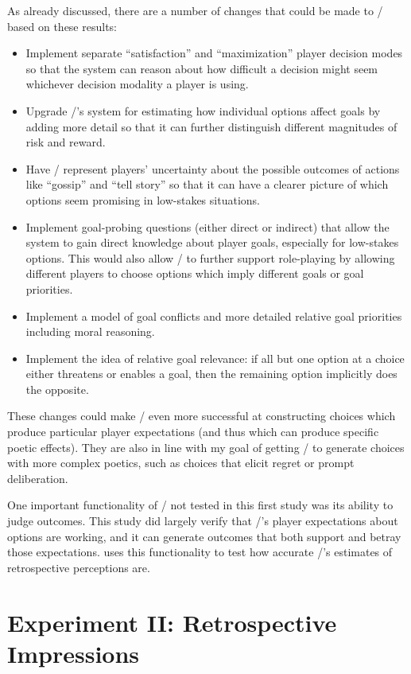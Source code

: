 As already discussed, there are a number of changes that could be made to \dunyazad/ based on these results:
%
\begin{itemize}
  \item Implement separate ``satisfaction'' and ``maximization'' player decision modes so that the system can reason about how difficult a decision might seem whichever decision modality a player is using.
  \item Upgrade \dunyazad/'s system for estimating how individual options affect goals by adding more detail so that it can further distinguish different magnitudes of risk and reward.
  \item Have \dunyazad/ represent players' uncertainty about the possible outcomes of actions like ``gossip'' and ``tell story'' so that it can have a clearer picture of which options seem promising in low-stakes situations.
  \item Implement goal-probing questions (either direct or indirect) that allow the system to gain direct knowledge about player goals, especially for low-stakes options. This would also allow \dunyazad/ to further support role-playing by allowing different players to choose options which imply different goals or goal priorities.
  \item Implement a model of goal conflicts and more detailed relative goal priorities including moral reasoning.
  \item Implement the idea of relative goal relevance: if all but one option at a choice either threatens or enables a goal, then the remaining option implicitly does the opposite.
\end{itemize}
%
These changes could make \dunyazad/ even more successful at constructing choices which produce particular player expectations (and thus which can produce specific poetic effects).
%
They are also in line with my goal of getting \dunyazad/ to generate choices with more complex poetics, such as choices that elicit regret or prompt deliberation.


One important functionality of \dunyazad/ not tested in this first study was its ability to judge outcomes.
%
This study did largely verify that \dunyazad/'s player expectations about options are working, and it can generate outcomes that both support and betray those expectations.
%
 uses this functionality to test how accurate \dunyazad/'s estimates of retrospective perceptions are.

\section{Experiment II: Retrospective Impressions}

